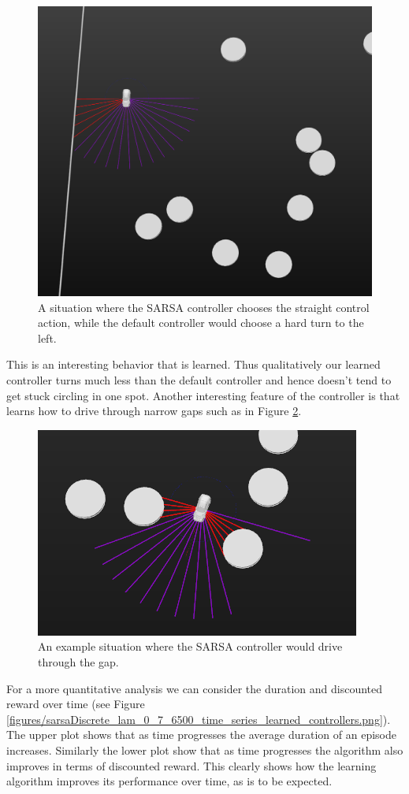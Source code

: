 \documentclass{article}
\begin{document}
\begin{figure}
\centering
\includegraphics[scale=0.4]{figures/driveStraightDirector.png}
\caption{A situation where the SARSA controller chooses the straight control action, while the default controller would choose a hard turn to the left.}
\label{figures/driveStraightDirector.png}
\end{figure}
%
%
This is an interesting behavior that is learned. Thus qualitatively our learned controller turns much less than the default controller and hence doesn't tend to get stuck circling in one spot. Another interesting feature of the controller is that learns how to drive through narrow gaps such as in Figure \ref{figures/narrowGap.png}.
%
%
\begin{figure}
\centering
\includegraphics[scale=0.6]{figures/narrowGap.png}
\caption{An example situation where the SARSA controller would drive through the gap.}
\label{figures/narrowGap.png}
\end{figure}
%
%
%
For a more quantitative analysis we can consider the duration and discounted reward over time (see Figure \ref{figures/sarsaDiscrete_lam_0_7_6500_time_series_learned_controllers.png}). The upper plot shows that as time progresses the average duration of an episode increases. Similarly the lower plot show that as time progresses the algorithm also improves in terms of discounted reward. This clearly shows how the learning algorithm improves its performance over time, as is to be expected. 
\end{document}
